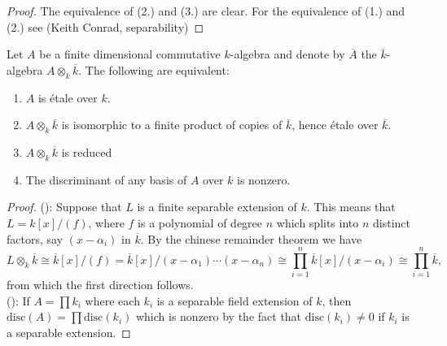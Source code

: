 \begin{proof}
  The equivalence of (2.) and (3.) are clear. 
  For the equivalence of (1.) and (2.) see (Keith Conrad, separability)
\end{proof}

\begin{theorem}
  Let $A$ be a finite dimensional commutative $k$-algebra and denote by $\overline{A}$ the $\overline{k}$-algebra $A \otimes_k \overline{k}$. The following are equivalent:
  \begin{enumerate}
    \item $A$ is \'etale over $k$.\label{etale}
    \item $A \otimes_k \overline{k}$ is isomorphic to a finite product of copies of $\overline{k}$, hence \'etale over $\overline{k}$.\label{product}
    \item $A \otimes_k \overline{k}$ is reduced
    \item The discriminant of any basis of $A$ over $k$ is nonzero.\label{trace}
  \end{enumerate}
\end{theorem}

\begin{proof}
  ():
  Suppose that $L$ is a finite separable extension of $k$. This means that $L = k[x]/(f)$, where $f$ is a polynomial of degree $n$ which splits into $n$ distinct factors, say $(x-\alpha_i)$ in $\overline{k}$. By the chinese remainder theorem we have
  \[L \otimes_k \overline{k} \cong \overline{k}[x]/(f) = \overline{k}[x]/(x-\alpha_1)\cdots(x-\alpha_n) \cong \prod_{i=1}^n \overline{k}[x] / (x-\alpha_i) \cong \prod_{i=1}^n \overline{k},\] from which the first direction follows.\\
  ():
  If $A = \prod k_i$  where each $k_i$ is a separable field extension of $k$, then $\text{disc}(A) = \prod \text{disc}(k_i)$ which is nonzero by the fact that $\text{disc}(k_i) \neq 0$ if $k_i$ is a separable extension.
\end{proof}


